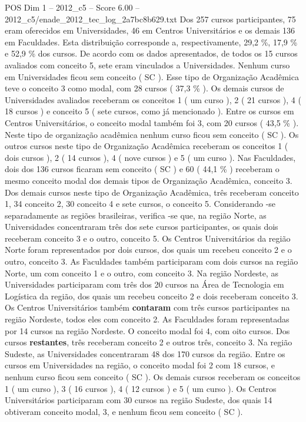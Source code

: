 \begin{textsample}{POS Dim 1 – 2012\_c5 – Score 6.00 – 2012\_c5/enade\_2012\_tec\_log\_2a7bc8b629.txt}
Dos 257 cursos participantes, 75 eram oferecidos em Universidades, 46 em Centros Universitários e os demais 136 em Faculdades.
Esta distribuição corresponde a, respectivamente, 29,2 \%, 17,9 \% e 52,9 \% dos cursos.
De acordo com os dados apresentados, de todos os 15 cursos avaliados com conceito 5, sete eram vinculados a Universidades.
Nenhum curso em Universidades ficou sem conceito ( SC ).
Esse tipo de Organização Acadêmica teve o conceito 3 como modal, com 28 cursos ( 37,3 \% ).
Os demais cursos de Universidades avaliados receberam os conceitos 1 ( um curso ), 2 ( 21 cursos ), 4 ( 18 cursos ) e conceito 5 ( sete cursos, como já mencionado ).
Entre os cursos em Centros Universitários, o conceito modal também foi 3, com 20 cursos ( 43,5 \% ).
Neste tipo de organização acadêmica nenhum curso ficou sem conceito ( SC ).
Os outros cursos neste tipo de Organização Acadêmica receberam os conceitos 1 ( dois cursos ), 2 ( 14 cursos ), 4 ( nove cursos ) e 5 ( um curso ).
Nas Faculdades, dois dos 136 cursos ficaram sem conceito ( SC ) e 60 ( 44,1 \% ) receberam o mesmo conceito modal dos demais tipos de Organização Acadêmica, conceito 3.
Dos demais cursos neste tipo de Organização Acadêmica, três receberam conceito 1, 34 conceito 2, 30 conceito 4 e sete cursos, o conceito 5.
Considerando -se separadamente as regiões brasileiras, verifica -se que, na região Norte, as Universidades concentraram três dos sete cursos participantes, os quais dois receberam conceito 3 e o outro, conceito 5.
Os Centros Universitários da região Norte foram representados por dois cursos, dos quais um recebeu conceito 2 e o outro, conceito 3.
As Faculdades também participaram com dois cursos na região Norte, um com conceito 1 e o outro, com conceito 3.
Na região Nordeste, as Universidades participaram com três dos 20 cursos na Área de Tecnologia em Logística da região, dos quais um recebeu conceito 2 e dois receberam conceito 3.
Os Centros Universitários também \textbf{contaram} com três cursos participantes na região Nordeste, todos eles com conceito 2.
As Faculdades foram representadas por 14 cursos na região Nordeste.
O conceito modal foi 4, com oito cursos.
Dos cursos \textbf{restantes}, três receberam conceito 2 e outros três, conceito 3.
Na região Sudeste, as Universidades concentraram 48 dos 170 cursos da região.
Entre os cursos em Universidades na região, o conceito modal foi 2 com 18 cursos, e nenhum curso ficou sem conceito ( SC ).
Os demais cursos receberam os conceitos 1 ( um curso ), 3 ( 16 cursos ), 4 ( 12 cursos ) e 5 ( um curso ).
Os Centros Universitários participaram com 30 cursos na região Sudeste, dos quais 14 obtiveram conceito modal, 3, e nenhum ficou sem conceito ( SC ).

\end{textsample}
